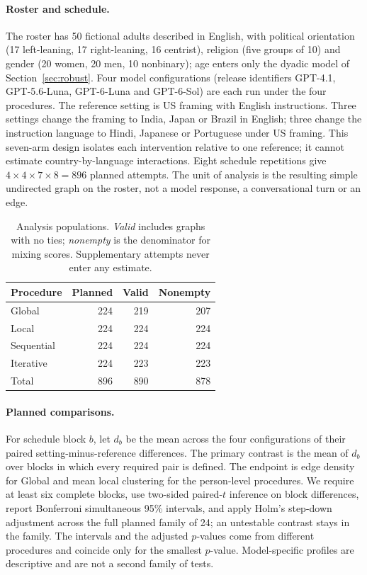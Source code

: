 \documentclass{article}
\begin{document}
\paragraph{Roster and schedule.} The roster has 50 fictional adults described in English, with political orientation (17 left-leaning, 17 right-leaning, 16 centrist), religion (five groups of 10) and gender (20 women, 20 men, 10 nonbinary); age enters only the dyadic model of Section~\ref{sec:robust}. Four model configurations (release identifiers GPT-4.1, GPT-5.6-Luna, GPT-6-Luna and GPT-6-Sol) are each run under the four procedures. The reference setting is US framing with English instructions. Three settings change the framing to India, Japan or Brazil in English; three change the instruction language to Hindi, Japanese or Portuguese under US framing. This seven-arm design isolates each intervention relative to one reference; it cannot estimate country-by-language interactions. Eight schedule repetitions give $4\times4\times7\times8=896$ planned attempts. The unit of analysis is the resulting simple undirected graph on the roster, not a model response, a conversational turn or an edge.

\begin{table}[t]\centering
\caption{Analysis populations. \emph{Valid} includes graphs with no ties; \emph{nonempty} is the denominator for mixing scores. Supplementary attempts never enter any estimate.}\label{tab:coverage}
\small
\begin{tabular}{lrrr}\toprule Procedure & Planned & Valid & Nonempty\\\midrule
Global &224&219&207\\Local &224&224&224\\Sequential &224&224&224\\Iterative &224&223&223\\\midrule Total&896&890&878\\\bottomrule\end{tabular}\end{table}

\paragraph{Planned comparisons.} For schedule block $b$, let $d_b$ be the mean across the four configurations of their paired setting-minus-reference differences. The primary contrast is the mean of $d_b$ over blocks in which every required pair is defined. The endpoint is edge density for Global and mean local clustering for the person-level procedures. We require at least six complete blocks, use two-sided paired-$t$ inference on block differences, report Bonferroni simultaneous 95\% intervals, and apply Holm's step-down adjustment \citep{holm} across the full planned family of 24; an untestable contrast stays in the family. The intervals and the adjusted $p$-values come from different procedures and coincide only for the smallest $p$-value. Model-specific profiles are descriptive and are not a second family of tests.
\end{document}
